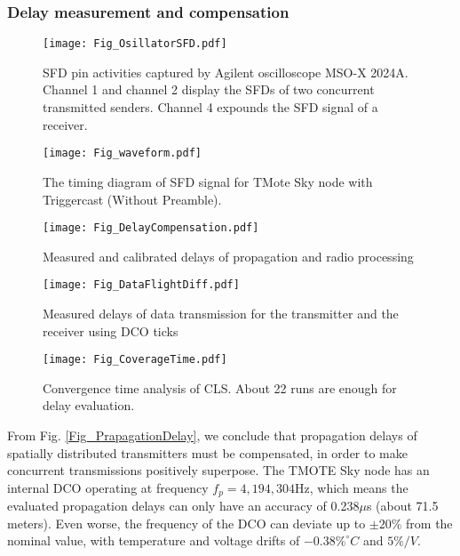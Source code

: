 \documentclass[conference]{IEEEtran}
\begin{document}
\subsubsection{Delay measurement and compensation}
\label{subsec_CLS}
\begin{figure}
\centering
\texttt{[image: Fig\_OsillatorSFD.pdf]}
\caption{SFD pin activities captured by Agilent oscilloscope MSO-X 2024A. Channel 1 and channel 2 display the SFDs of two concurrent transmitted senders. Channel 4 expounds the SFD signal of a receiver.}
\label{Fig_OsillatorSFD}
\end{figure}
\begin{figure}
\centering
\texttt{[image: Fig\_waveform.pdf]}
\caption{The timing diagram of SFD signal for TMote Sky node with Triggercast (Without Preamble).}
\label{Fig_waveform}
\end{figure}
\begin{figure*}[t]
  \centering
  \begin{minipage}[b]{0.32\textwidth}
    \centering
    \texttt{[image: Fig\_DelayCompensation.pdf]}
    \caption{Measured and calibrated delays of propagation and radio processing}
    \label{Fig_DelayCompensation}\end{minipage}\hspace{0.01\textwidth}\begin{minipage}[b]{0.32\textwidth}
    \centering
    \texttt{[image: Fig\_DataFlightDiff.pdf]}
    \caption{Measured delays of data transmission for the transmitter and the receiver using DCO ticks}
    \label{Fig_DataFlightDiff}\end{minipage}\hspace{0.01\linewidth}\begin{minipage}[b]{0.32\textwidth}
    \centering
    \texttt{[image: Fig\_CoverageTime.pdf]}
    \caption{Convergence time analysis of CLS. About 22 runs are enough for delay evaluation.}
    \label{Fig_CoverageTime}
  \end{minipage}\end{figure*}
\indent From Fig. \ref{Fig_PrapagationDelay}, we conclude that propagation delays of spatially distributed transmitters must be compensated, in order to make concurrent transmissions positively superpose.
The TMOTE Sky node has an internal DCO operating at frequency $f_p=4,194,304$Hz, which means the evaluated propagation delays can only have an accuracy of 0.238$\mu$s (about 71.5 meters).
Even worse, the frequency of the DCO can deviate up to $\pm 20\%$ from the nominal value, with temperature and voltage drifts of $-0.38\%^\circ C$ and $5\%/V$.
\end{document}
